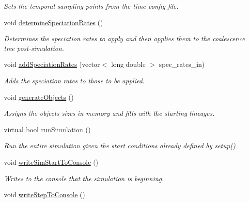 \begin{DoxyCompactItemize}
\begin{DoxyCompactList}\small\item\em Sets the temporal sampling points from the time config file. \end{DoxyCompactList}\item 
void \hyperlink{class_tree_a25f082da13789dfa3fefcbcfd08b4dfe}{determine\+Speciation\+Rates} ()
\begin{DoxyCompactList}\small\item\em Determines the speciation rates to apply and then applies them to the coalescence tree post-\/simulation. \end{DoxyCompactList}\item 
void \hyperlink{class_tree_a38488499b196d3f5ee40b2a68fe3279e}{add\+Speciation\+Rates} (vector$<$ long double $>$ spec\+\_\+rates\+\_\+in)\hypertarget{class_tree_a38488499b196d3f5ee40b2a68fe3279e}{}\label{class_tree_a38488499b196d3f5ee40b2a68fe3279e}

\begin{DoxyCompactList}\small\item\em Adds the speciation rates to those to be applied. \end{DoxyCompactList}\item 
void \hyperlink{class_tree_a50b3d13d4032e0d7a69890b9bd7f84fa}{generate\+Objects} ()\hypertarget{class_tree_a50b3d13d4032e0d7a69890b9bd7f84fa}{}\label{class_tree_a50b3d13d4032e0d7a69890b9bd7f84fa}

\begin{DoxyCompactList}\small\item\em Assigns the objects sizes in memory and fills with the starting lineages. \end{DoxyCompactList}\item 
virtual bool \hyperlink{class_tree_afe75245862a1c40030c1c8607518cf8d}{run\+Simulation} ()
\begin{DoxyCompactList}\small\item\em Run the entire simulation given the start conditions already defined by \hyperlink{class_tree_aec10ea2b720edc13a38310afdfe2b6e4}{setup()} \end{DoxyCompactList}\item 
void \hyperlink{class_tree_a95360a2f62ef0eb436d586552b299e1f}{write\+Sim\+Start\+To\+Console} ()\hypertarget{class_tree_a95360a2f62ef0eb436d586552b299e1f}{}\label{class_tree_a95360a2f62ef0eb436d586552b299e1f}

\begin{DoxyCompactList}\small\item\em Writes to the console that the simulation is beginning. \end{DoxyCompactList}\item 
void \hyperlink{class_tree_a37de93174eece50a2fc082b683d97047}{write\+Step\+To\+Console} ()\hypertarget{class_tree_a37de93174eece50a2fc082b683d97047}{}\label{class_tree_a37de93174eece50a2fc082b683d97047}


\end{DoxyCompactItemize}
